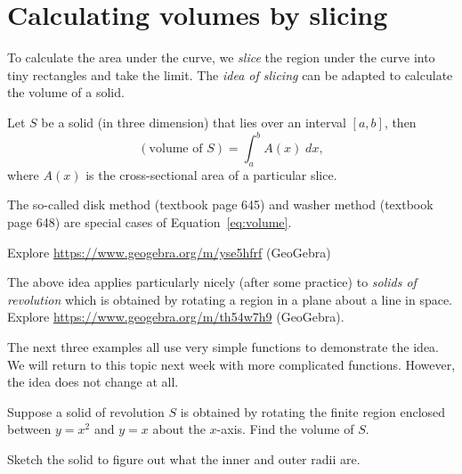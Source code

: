 \documentclass[../main.tex]{subfiles}
\begin{document}
 \section{Calculating volumes by slicing}
  To calculate the area under the curve, we \emph{slice} the region under the curve into tiny rectangles and take the limit. The \emph{idea of slicing} can be adapted to calculate the volume of a solid.

  \begin{mdframed}[style=withref-compact]
    Let \(S\) be a solid (in three dimension) that lies over an interval \([a,b]\), then
    \begin{equation} \label{eq:volume}
      (\text{volume of } S) = \int_{a}^{b} A(x) \;dx,
    \end{equation}
    where \(A(x)\) is the cross-sectional area of a particular slice.

    The so-called disk method (textbook page 645) and washer method (textbook page 648) are special cases of Equation~\eqref{eq:volume}.
  \end{mdframed}

  {\footnotesize Explore \url{https://www.geogebra.org/m/yse5hfrf} (GeoGebra)}



  The above idea applies particularly nicely (after some practice) to \emph{solids of revolution} which is obtained by rotating a region in a plane about a line in space. \\
  {\footnotesize Explore \url{https://www.geogebra.org/m/th54w7h9} (GeoGebra).}

  \clearpage


  The next three examples all use very simple functions to demonstrate the idea. We will return to this topic next week with more complicated functions. However, the idea does not change at all.

  \begin{example}
    Suppose a solid of revolution \(S\) is obtained by rotating the finite region enclosed between \(y = x^{2}\) and \(y = x\) about the \(x\)-axis. Find the volume of \(S\).


    Sketch the solid to figure out what the inner and outer radii are.

    

  \end{example}
  \clearpage
\end{document}
